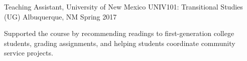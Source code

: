\begin{cventries}
        \cventry
    {Teaching Assistant, University of New Mexico} %
    {UNIV101: Transitional Studies (UG)} %
    {Albuquerque, NM} %
    {Spring 2017} %
    {
      \begin{cvitems} %
    \item Supported the course by recommending readings to first-generation college students, grading assignments, \newline and helping students coordinate community service projects.
      \end{cvitems}
    }
    

\end{cventries}
